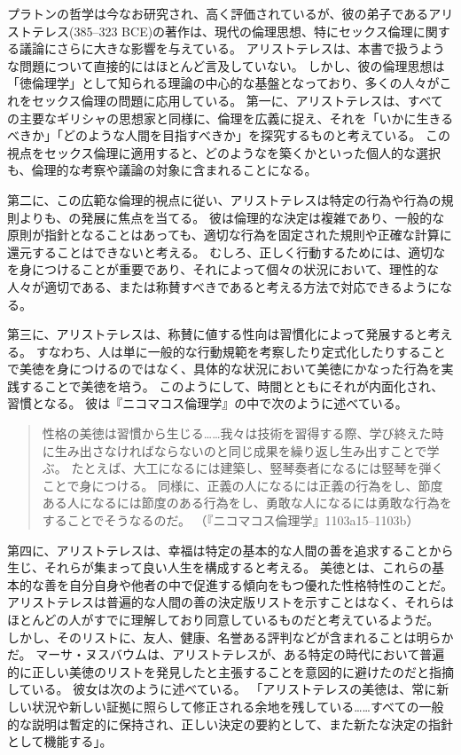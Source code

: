 \documentclass[paper=a4,book,openany]{jlreq}
\begin{document}
プラトンの哲学は今なお研究され、高く評価されているが、彼の弟子であるアリストテレス(385--323 BCE)の著作は、現代の倫理思想、特にセックス倫理に関する議論にさらに大きな影響を与えている。
アリストテレスは、本書で扱うような問題について直接的にはほとんど言及していない。
しかし、彼の倫理思想は「徳倫理学」として知られる理論の中心的な基盤となっており、多くの人々がこれをセックス倫理の問題に応用している。
第一に、アリストテレスは、すべての主要なギリシャの思想家と同様に、倫理を広義に捉え、それを「いかに生きるべきか」「どのような人間を目指すべきか」を探究するものと考えている。
この視点をセックス倫理に適用すると、どのようなを築くかといった個人的な選択も、倫理的な考察や議論の対象に含まれることになる。

第二に、この広範な倫理的視点に従い、アリストテレスは特定の行為や行為の規則よりも、の発展に焦点を当てる。
彼は倫理的な決定は複雑であり、一般的な原則が指針となることはあっても、適切な行為を固定された規則や正確な計算に還元することはできないと考える。
むしろ、正しく行動するためには、適切なを身につけることが重要であり、それによって個々の状況において、理性的な人々が適切である、または称賛すべきであると考える方法で対応できるようになる。

第三に、アリストテレスは、称賛に値する性向は習慣化によって発展すると考える。
すなわち、人は単に一般的な行動規範を考察したり定式化したりすることで美徳を身につけるのではなく、具体的な状況において美徳にかなった行為を実践することで美徳を培う。
このようにして、時間とともにそれが内面化され、習慣となる。
彼は『ニコマコス倫理学』の中で次のように述べている。

\begin{quote}
  性格の美徳は習慣から生じる……我々は技術を習得する際、学び終えた時に生み出さなければならないのと同じ成果を繰り返し生み出すことで学ぶ。
たとえば、大工になるには建築し、竪琴奏者になるには竪琴を弾くことで身につける。
同様に、正義の人になるには正義の行為をし、節度ある人になるには節度のある行為をし、勇敢な人になるには勇敢な行為をすることでそうなるのだ。
（『ニコマコス倫理学』1103a15--1103b）
\end{quote}

第四に、アリストテレスは、幸福は特定の基本的な人間の善を追求することから生じ、それらが集まって良い人生を構成すると考える。
美徳とは、これらの基本的な善を自分自身や他者の中で促進する傾向をもつ優れた性格特性のことだ。
アリストテレスは普遍的な人間の善の決定版リストを示すことはなく、それらはほとんどの人がすでに理解しており同意しているものだと考えているようだ。
しかし、そのリストに、友人、健康、名誉ある評判などが含まれることは明らかだ。
マーサ・ヌスバウムは、アリストテレスが、ある特定の時代において普遍的に正しい美徳のリストを発見したと主張することを意図的に避けたのだと指摘している。
彼女は次のように述べている。
「アリストテレスの美徳は、常に新しい状況や新しい証拠に照らして修正される余地を残している……すべての一般的な説明は暫定的に保持され、正しい決定の要約として、また新たな決定の指針として機能する」\citep[pp.259--260]{nussbaum93:_non_relat_virtues}。
\end{document}
